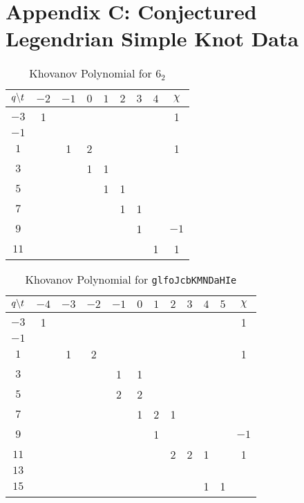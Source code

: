 \documentclass{article}
\theoremstyle{plain}
\begin{document}
    \section{Appendix C: Conjectured Legendrian Simple Knot Data}
        \begin{table}
            \centering
            \begin{tabular}{| c | c | c | c | c | c | c | c | c |}
                \hline
                $q\symbol{92}t$&$-2$&$-1$&$0$&$1$&$2$&$3$&$4$&$\chi$\\
                \hline
                $-3$&1&&&&&&&1\\
                \hline
                $-1$&&&&&&&&\\
                \hline
                $1$&&1&2&&&&&1\\
                \hline
                $3$&&&1&1&&&&\\
                \hline
                $5$&&&&1&1&&&\\
                \hline
                $7$&&&&&1&1&&\\
                \hline
                $9$&&&&&&1&&$-1$\\
                \hline
                $11$&&&&&&&1&1\\
                \hline
            \end{tabular}
            \caption{Khovanov Polynomial for $6_{2}$}
        \end{table}
        \begin{table}
            \centering
            \begin{tabular}{| c | c | c | c | c | c | c | c | c | c | c | c |}
                \hline
                $q\symbol{92}t$&$-4$&$-3$&$-2$&$-1$&$0$&$1$&$2$&$3$&$4$&$5$&$\chi$\\
                \hline
                $-3$&1&&&&&&&&&&1\\
                \hline
                $-1$&&&&&&&&&&&\\
                \hline
                $1$&&1&2&&&&&&&&1\\
                \hline
                $3$&&&&1&1&&&&&&\\
                \hline
                $5$&&&&2&2&&&&&&\\
                \hline
                $7$&&&&&1&2&1&&&&\\
                \hline
                $9$&&&&&&1&&&&&$-1$\\
                \hline
                $11$&&&&&&&2&2&1&&1\\
                \hline
                $13$&&&&&&&&&&&\\
                \hline
                $15$&&&&&&&&&1&1&\\
                \hline
            \end{tabular}
            \caption{Khovanov Polynomial for \texttt{glfoJcbKMNDaHIe}}
        \end{table}
\end{document}
